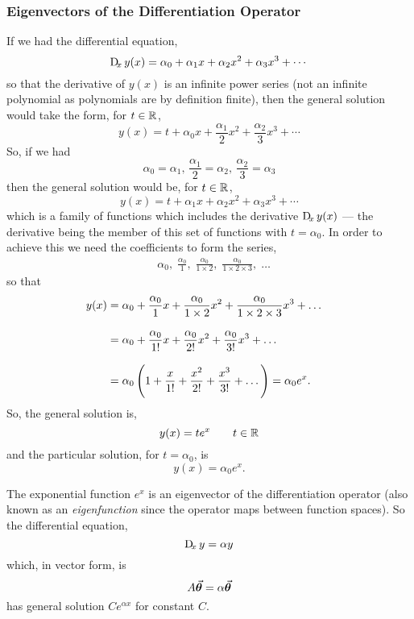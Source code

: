 \documentclass[MathsNotesBase.tex]{subfiles}
\begin{document}
{		\subsubsection{Eigenvectors of the Differentiation Operator}\label{sss:eigenvectors-of-differentiation}
		\bigskip
		If we had the differential equation,
		\begin{equation}
		\Dif_x y(x) = \alpha_0 + \alpha_1 x + \alpha_2 x^2 + \alpha_3 x^3 + \cdots
		\end{equation}
		so that the derivative of $y(x)$ is an infinite power series (not an infinite polynomial as polynomials are by definition finite), then the general solution would take the form, for ${ t \in \mathbb{R}^{} }$,
		\begin{equation}
			y(x) = t + \alpha_0 x + \frac{\alpha_1}{2} x^2 + \frac{\alpha_2}{3} x^3 + \cdots
		\end{equation}
		So, if we had
		\[ \alpha_0 = \alpha_1,\, \frac{\alpha_1}{2} = \alpha_2,\, \frac{\alpha_2}{3} = \alpha_3 \]
		then the general solution would be, for ${ t \in \mathbb{R}^{} }$,
		\begin{equation}
			y(x) = t + \alpha_1 x + \alpha_2 x^2 + \alpha_3 x^3 + \cdots
		\end{equation}
		which is a family of functions which includes the derivative ${ \Dif_x y(x) }$ --- the derivative being the member of this set of functions with ${ t = \alpha_0 }$. In order to achieve this we need the coefficients to form the series,
		\begin{align*}
		&\alpha_0,\; \frac{\alpha_0}{1},\; \frac{\alpha_0}{1 \times 2},\; \frac{\alpha_0}{1 \times 2 \times 3},\; \dots
		\end{align*}
		so that
		\begin{align*}
		y(x) &= \alpha_0 + \frac{\alpha_0}{1}x + \frac{\alpha_0}{1 \times 2}x^2 + \frac{\alpha_0}{1 \times 2 \times 3}x^3 + \dots \\[8pt]
		&= \alpha_0 + \frac{\alpha_0}{1!}x + \frac{\alpha_0}{2!}x^2 + \frac{\alpha_0}{3!}x^3 + \dots &\text{\scriptsize{}} \\[8pt]
		&= \alpha_0\left(1 + \frac{x}{1!} + \frac{x^2}{2!} + \frac{x^3}{3!} + \dots \right) = \alpha_0 e^x.
		\end{align*}
		So, the general solution is,
		\[ y(x) = t e^x \hspace{20pt} t \in \mathbb{R}^{} \]
		and the particular solution, for ${ t = \alpha_0 }$, is
		\[ y(x) = \alpha_0 e^x. \]
		
		\bigskip\bigskip\bigskip
		The exponential function $e^x$ is an eigenvector of the differentiation operator (also known as an \textit{eigenfunction} since the operator maps between function spaces). So the differential equation,
		\begin{equation}
			\Dif_x y = \alpha y
		\end{equation}
		which, in vector form, is
		\begin{equation}
			A\vec{\bm{\theta}} = \alpha \vec{\bm{\theta}}
		\end{equation}
		has general solution $Ce^{\alpha x}$ for constant $C$.
	}
\end{document}

